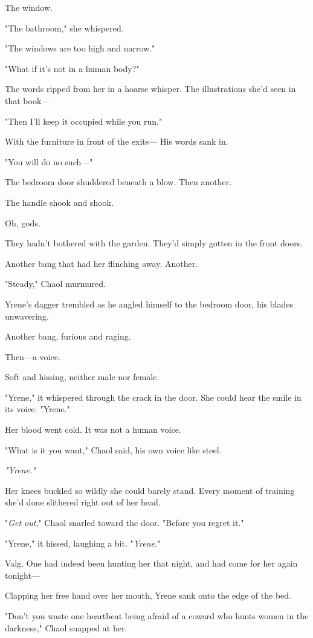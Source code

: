 The window.

"The bathroom," she whispered.

"The windows are too high and narrow."

"What if it's not in a human body?"

The words ripped from her in a hoarse whisper.
The illustrations she'd seen in that book---

"Then I'll keep it occupied while you run."

With the furniture in front of the exits--- His words sank in.

"You will do no such---"

The bedroom door shuddered beneath a blow.
Then another.

The handle shook and shook.

Oh, gods.

They hadn't bothered with the garden.
They'd simply gotten in the front doors.

Another bang that had her flinching away.
Another.

"Steady," Chaol murmured.

Yrene's dagger trembled as he angled himself to the bedroom door, his blades unwavering.

Another bang, furious and raging.

Then---a voice.

Soft and hissing, neither male nor female.

"Yrene," it whispered through the crack in the door.
She could hear the smile in its voice.
"Yrene."

Her blood went cold.
It was not a human voice.

"What is it you want," Chaol said, his own voice like steel.

\emph{"Yrene."}

Her knees buckled so wildly she could barely stand.
Every moment of training she'd done slithered right out of her head.

"\emph{Get out}," Chaol snarled toward the door.
"Before you regret it."

"Yrene," it hissed, laughing a bit.
"\emph{Yrene.}"

Valg.
One had indeed been hunting her that night, and had come for her again tonight---

Clapping her free hand over her mouth, Yrene sank onto the edge of the bed.

"Don't you waste one heartbeat being afraid of a coward who hunts women in the darkness," Chaol snapped at her.

